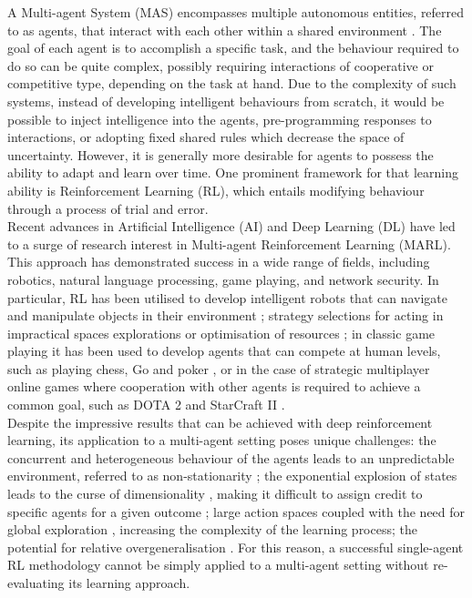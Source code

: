 \documentclass[a4paper,singleside,12pt]{report} %
\begin{document}
A Multi-agent System (MAS) encompasses multiple autonomous entities, referred to as agents, that interact with each other within a shared environment \cite{weiss1999multiagent}. The goal of each agent is to accomplish a specific task, and the behaviour required to do so can be quite complex, possibly requiring interactions of cooperative or competitive type, depending on the task at hand. Due to the complexity of such systems, instead of developing intelligent behaviours from scratch, it would be possible to inject intelligence into the agents, pre-programming responses to interactions, or adopting fixed shared rules which decrease the space of uncertainty. However, it is generally more desirable for agents to possess the ability to adapt and learn over time. One prominent framework for that learning ability is Reinforcement Learning (RL), which entails modifying behaviour through a process of trial and error.\\
Recent advances in Artificial Intelligence (AI) and Deep Learning (DL) have led to a surge of research interest in Multi-agent Reinforcement Learning (MARL). This approach has demonstrated success in a wide range of fields, including robotics, natural language processing, game playing, and network security. In particular, RL has been utilised to develop intelligent robots that can navigate and manipulate objects in their environment \cite{Albrecht2017AutonomousAM}; strategy selections for acting in impractical spaces explorations \cite{Silva2019ASO} or optimisation of resources \cite{Mnih2015HumanlevelCT}; in classic game playing it has been used to develop agents that can compete at human levels, such as playing chess, Go and poker \cite{Silver2016MasteringTG, Silver2017MasteringTG, Brown2018SuperhumanAF}, or in the case of strategic multiplayer online games where cooperation with other agents is required to achieve a common goal, such as DOTA 2 \cite{OpenAI_dota} and StarCraft II \cite{Vinyals2019GrandmasterLI}.\\
Despite the impressive results that can be achieved with deep reinforcement learning, its application to a multi-agent setting poses unique challenges: the concurrent and heterogeneous behaviour of the agents leads to an unpredictable environment, referred to as non-stationarity \cite{Shoham2007IfML, Buoniu2008ACS, HernandezLeal2017ASO}; the exponential explosion of states leads to the curse of dimensionality \cite{Shoham2007IfML, Buoniu2008ACS}, making it difficult to assign credit to specific agents for a given outcome \cite{Wolpert2001OptimalPF, Agogino2004UnifyingTA}; large action spaces coupled with the need for global exploration \cite{Matignon2012IndependentRL}, increasing the complexity of the learning process; the potential for relative overgeneralisation \cite{Fulda2007PredictingAP, Wei2016LenientLI, Palmer2017LenientMD}. For this reason, a successful single-agent RL methodology cannot be simply applied to a multi-agent setting without re-evaluating its learning approach.
\end{document}
